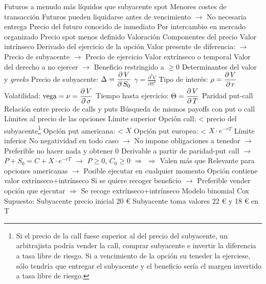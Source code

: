 \documentclass{nuevotema}
\begin{document}
\begin{esquemal}
				\4 Futuros a menudo más líquidos que subyacente spot
				\4 Menores costes de transacción
				\4 Futuros pueden liquidarse antes de vencimiento
				\4[] $\to$ No necesaria entrega
				\4 Precio del futuro conocido de inmediato
				\4[] Por intercambio en mercado organizado
				\4[] Precio spot menos definido
		\2 Valoración
			\3 Componentes del precio
				\4 Valor intrínseco
				\4[] Derivado del ejercicio de la opción
				\4[] Valor presente de diferencia:
				\4[] $\to$ Precio de subyacente
				\4[] $\to$ Precio de ejercicio
				\4 Valor extrínseco o temporal
				\4[] Valor del derecho a no ejercer
				\4[] $\to$ Beneficio restringido a $\geq 0$
			\3 Determinantes del valor y \textit{greeks}
				\4 Precio de subyacente:
				\4[] $\Delta = \dfrac{\partial \, V}{\partial \, S_0}$
				\4[] $\gamma = \frac{\partial^2 V}{\partial S^2}$
				\4 Tipo de interés:
				\4[] $\rho = \dfrac{\partial \, V}{\partial \, r}$
				\4 Volatilidad:
				\4[] $\text{vega}=\nu = \dfrac{\partial \, V}{\partial \, \sigma}$
				\4 Tiempo hasta ejercicio:
				\4[] $\Theta = \dfrac{\partial \, V}{\partial \, T}$
			\3 Paridad put-call
				\4 Relación entre precio de calls y puts
				\4 Búsqueda de mismos payoffs con put o call
				\4 
			\3 Límites al precio de las opciones
				\4 Límite superior
				\4[] Opción call: < precio del subyacente\footnote{Si el precio de la call fuese superior al del precio del subyacente, un arbitrajista podría vender la call, comprar subyacente e invertir la diferencia a tasa libre de riesgo. Si a vencimiento de la opción su teneder la ejerciese, sólo tendría que entregar el subyacente y el beneficio sería el margen invertido a tasa libre de riesgo.}
				\4[] Opción put americana: < $X$
				\4[] Opción put europea: < $X\cdot e^{-rT}$
				\4 Límite inferior
				\4[] No negatividad en todo caso
				\4[] $\to$ No impone obligaciones a tenedor
				\4[] $\to$ Preferible no hacer nada y obtener 0
				\4[] Derivable a partir de paridad-put call
				\4[] $\to$ $P + S_0 = C + X\cdot e^{-rT}$
				\4[] $\to$ $P \geq 0$, $C_0 \geq 0$
				\4[] $\Rightarrow$ 
				\4[] $\Rightarrow$ 
				\4 Valen más  que 
				\4[] Relevante para opciones americanas
				\4[] $\to$ Posible ejecutar en cualquier momento
				\4[] Opción contiene valor extrínseco+intrínseco
				\4[] Si se quiere recoger beneficio
				\4[] $\to$ Preferible vender opción que ejecutar
				\4[] $\Rightarrow$ Se recoge extrínseco+intrínseco
			\3 Modelo binomial
				\4 Cox
				\4 Supuesto:
				\4[] Subyacente precio inicial 20 €
				\4[] Subyacente toma valores 22 € y 18 € en T

\end{esquemal}
\end{document}

